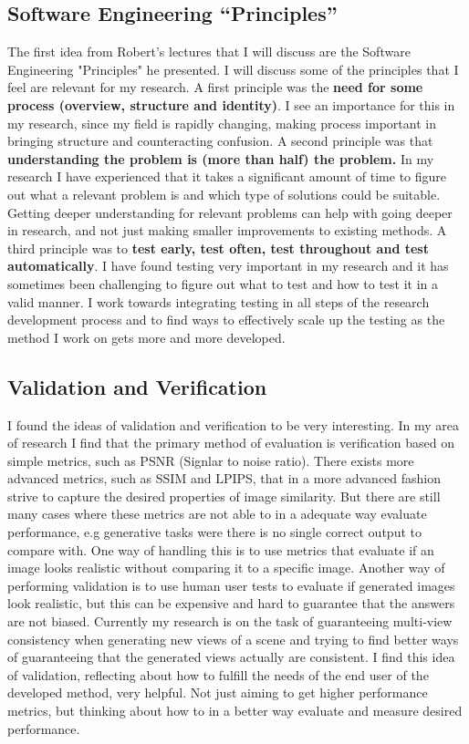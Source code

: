 \documentclass[11pt]{article}
\begin{document}
\subsection{Software Engineering “Principles”}
The first idea from Robert's lectures that I will discuss are the Software Engineering "Principles" he presented. I will discuss some of the principles that I feel are relevant for my research. A first principle was the \textbf{need for some process (overview, structure and identity)}. I see an importance for this in my research, since my field is rapidly changing, making process important in bringing structure and counteracting confusion. A second principle was that \textbf{understanding the problem is (more than half) the problem.} In my research I have experienced that it takes a  significant amount of time to  figure out what a relevant problem is and which type of solutions could be suitable. Getting deeper understanding for relevant problems can help with going deeper in research, and not just making smaller improvements to existing methods. A third principle was to \textbf{test early, test often, test throughout and test automatically}.  I have found testing very important in my research and it has sometimes been challenging to figure out what to test and how to test it in a valid manner. I work towards integrating testing in all steps of the research development process and to find ways to effectively scale up the testing as the method I work on gets more and more developed. 

\subsection{Validation and Verification}
I found the ideas of validation and verification to be very interesting. In my area of research I find that the primary method of evaluation is verification based on  simple metrics, such as PSNR (Signlar to noise ratio). There exists more advanced metrics, such as SSIM and LPIPS, that in a more advanced fashion strive to capture the desired properties of image similarity. But there are still many cases where these metrics are not able to in a adequate way evaluate performance, e.g generative tasks were there is no single correct output to compare with. One way of handling this is to use metrics that evaluate if an image looks realistic without comparing it to a specific image. Another way of performing validation is to use human user tests to evaluate if generated images look realistic, but this can be expensive and hard to guarantee that the answers are not biased. Currently my research is on the task of guaranteeing multi-view consistency when generating new views of a scene and trying to find better ways of guaranteeing that the generated views actually are consistent. I find this idea of validation, reflecting about how to fulfill the needs of the end user of the developed method, very helpful. Not just aiming to get higher performance metrics, but thinking about how to in a better way evaluate and measure desired performance.
\end{document}
